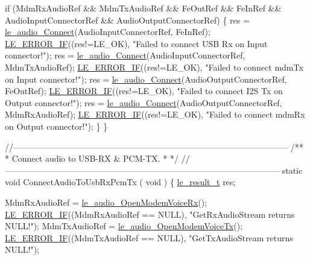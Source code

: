 \begin{DoxyCodeInclude}
{{{{{{{{{{{    \textcolor{keywordflow}{if} (MdmRxAudioRef && MdmTxAudioRef && FeOutRef && FeInRef &&
        AudioInputConnectorRef && AudioOutputConnectorRef)
    \{
        res = \hyperlink{le__audio__interface_8h_a338df65b2fb1ae0140d86880adbcf0de}{le\_audio\_Connect}(AudioInputConnectorRef, FeInRef);
        \hyperlink{le__log_8h_aceaf11a11691d6c676e36dd317b38dbd}{LE\_ERROR\_IF}((res!=LE\_OK), \textcolor{stringliteral}{"Failed to connect USB Rx on Input connector!"});
        res = \hyperlink{le__audio__interface_8h_a338df65b2fb1ae0140d86880adbcf0de}{le\_audio\_Connect}(AudioInputConnectorRef, MdmTxAudioRef);
        \hyperlink{le__log_8h_aceaf11a11691d6c676e36dd317b38dbd}{LE\_ERROR\_IF}((res!=LE\_OK), \textcolor{stringliteral}{"Failed to connect mdmTx on Input connector!"});
        res = \hyperlink{le__audio__interface_8h_a338df65b2fb1ae0140d86880adbcf0de}{le\_audio\_Connect}(AudioOutputConnectorRef, FeOutRef);
        \hyperlink{le__log_8h_aceaf11a11691d6c676e36dd317b38dbd}{LE\_ERROR\_IF}((res!=LE\_OK), \textcolor{stringliteral}{"Failed to connect I2S Tx on Output connector!"});
        res = \hyperlink{le__audio__interface_8h_a338df65b2fb1ae0140d86880adbcf0de}{le\_audio\_Connect}(AudioOutputConnectorRef, MdmRxAudioRef);
        \hyperlink{le__log_8h_aceaf11a11691d6c676e36dd317b38dbd}{LE\_ERROR\_IF}((res!=LE\_OK), \textcolor{stringliteral}{"Failed to connect mdmRx on Output connector!"});
    \}
\}

\textcolor{comment}{//--------------------------------------------------------------------------------------------------}\textcolor{comment}{}
\textcolor{comment}{/**}
\textcolor{comment}{ * Connect audio to USB-RX & PCM-TX.}
\textcolor{comment}{ *}
\textcolor{comment}{ */}
\textcolor{comment}{//--------------------------------------------------------------------------------------------------}
\textcolor{keyword}{static} \textcolor{keywordtype}{void} ConnectAudioToUsbRxPcmTx
(
    \textcolor{keywordtype}{void}
)
\{
    \hyperlink{le__basics_8h_a1cca095ed6ebab24b57a636382a6c86c}{le\_result\_t} res;

    MdmRxAudioRef = \hyperlink{le__audio__interface_8h_ae3ed568ba4d2763ea77e17e77b20ff02}{le\_audio\_OpenModemVoiceRx}();
    \hyperlink{le__log_8h_aceaf11a11691d6c676e36dd317b38dbd}{LE\_ERROR\_IF}((MdmRxAudioRef == NULL), \textcolor{stringliteral}{"GetRxAudioStream returns NULL!"});
    MdmTxAudioRef = \hyperlink{le__audio__interface_8h_ad745f008bb04873c817da7af3daf783d}{le\_audio\_OpenModemVoiceTx}();
    \hyperlink{le__log_8h_aceaf11a11691d6c676e36dd317b38dbd}{LE\_ERROR\_IF}((MdmTxAudioRef == NULL), \textcolor{stringliteral}{"GetTxAudioStream returns NULL!"});

}}}}}}}}}}}
\end{DoxyCodeInclude}
